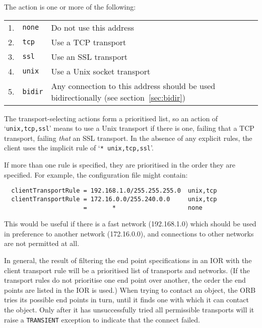 \documentclass[11pt,twoside,a4paper]{book}
\newcommand{\code}[1]{\texttt{#1}}
\newcommand{\dsc}{\discretionary{}{}{}}
\begin{document}
\vspace{\baselineskip}

\noindent The action is one or more of the following:

\vspace{\baselineskip}

\begin{tabular}{llp{}}
1. & \code{none} & Do not use this address\\
2. & \code{tcp}  & Use a TCP transport\\
3. & \code{ssl}  & Use an SSL transport\\
4. & \code{unix} & Use a Unix socket transport\\
5. & \code{bidir}& Any connection to this address should be used
                   bidirectionally (see section~\ref{sec:bidir})\\
\end{tabular}

\vspace{\baselineskip}

\noindent The transport-selecting actions form a prioritised list, so
an action of `\code{unix,tcp,\dsc{}ssl}' means to use a Unix transport if
there is one, failing that a TCP transport, failing \emph{that} an SSL
transport. In the absence of any explicit rules, the client uses the
implicit rule of `\code{* unix,tcp,ssl}'.

If more than one rule is specified, they are prioritised in the order
they are specified. For example, the configuration file might contain:

\begin{verbatim}
  clientTransportRule = 192.168.1.0/255.255.255.0  unix,tcp
  clientTransportRule = 172.16.0.0/255.240.0.0     unix,tcp
                      =       *                    none
\end{verbatim}

\noindent This would be useful if there is a fast network
(192.168.1.0) which should be used in preference to another network
(172.16.0.0), and connections to other networks are not permitted at
all.

In general, the result of filtering the end point specifications in an
IOR with the client transport rule will be a prioritised list of
transports and networks. (If the transport rules do not prioritise one
end point over another, the order the end points are listed in the IOR
is used.)  When trying to contact an object, the ORB tries its
possible end points in turn, until it finds one with which it can
contact the object. Only after it has unsuccessfully tried all
permissible transports will it raise a \code{TRANSIENT} exception to
indicate that the connect failed.
\end{document}
